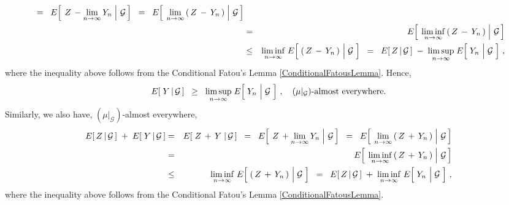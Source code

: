 \begin{enumerate}
\begin{eqnarray*}
	\;\; = \;\;
		E\!\left[\;\left.Z\,- \underset{n\rightarrow\infty}{\lim}\,Y_{n}\;\right\vert\,\mathcal{G}\,\right]
	\;\; = \;\;
		E\!\left[\;\left.\underset{n\rightarrow\infty}{\lim}\left(\,Z\,-\,Y_{n}\,\right)\;\right\vert\,\mathcal{G}\,\right]
	\\
	&=&
		E\!\left[\;\left.\underset{n\rightarrow\infty}{\liminf}\left(\,Z\,-\,Y_{n}\,\right)\;\right\vert\,\mathcal{G}\,\right]
	\\
	&\leq&
		\underset{n\rightarrow\infty}{\liminf}\;E\!\left[\;
			\left(\,Z\,-\,Y_{n}\,\right)\,\left\vert\;\overset{{\color{white}.}}{\mathcal{G}}\right.
			\,\right]
	\;\;=\;\;
		E\!\left[\,Z\,\vert\,\mathcal{G}\,\right] \;-\; 
		\underset{n\rightarrow\infty}{\limsup}\;E\!\left[\;
			Y_{n}\,\left\vert\;\overset{{\color{white}.}}{\mathcal{G}}\right.
			\,\right]\,,
	\end{eqnarray*}
	where the inequality above follows from the Conditional Fatou's Lemma \eqref{ConditionalFatousLemma}.
	Hence,
	\begin{equation*}
	E\!\left[\;Y\,\vert\,\mathcal{G}\,\right]
	\;\; \geq \;\;
		\underset{n\rightarrow\infty}{\limsup}\;E\!\left[\;
			Y_{n}\,\left\vert\;\overset{{\color{white}.}}{\mathcal{G}}\right.
			\,\right]\,,
	\quad
	\textnormal{$(\mu\vert_{\mathcal{G}})$-almost everywhere}.
	\end{equation*}
	Similarly, we also have, $(\mu\vert_{\mathcal{G}})$-almost everywhere,
	\begin{eqnarray*}
	E\!\left[\,Z\,\vert\,\mathcal{G}\,\right] \;+\; E\!\left[\;Y\,\vert\,\mathcal{G}\,\right]
	&=&
		E\!\left[\;Z\,+\,Y\;\vert\,\mathcal{G}\,\right]
	\;\; = \;\;
		E\!\left[\;\left.Z\,+ \underset{n\rightarrow\infty}{\lim}\,Y_{n}\;\right\vert\,\mathcal{G}\,\right]
	\;\; = \;\;
		E\!\left[\;\left.\underset{n\rightarrow\infty}{\lim}\left(\,Z\,+\,Y_{n}\,\right)\;\right\vert\,\mathcal{G}\,\right]
	\\
	&=&
		E\!\left[\;\left.\underset{n\rightarrow\infty}{\liminf}\left(\,Z\,+\,Y_{n}\,\right)\;\right\vert\,\mathcal{G}\,\right]
	\\
	&\leq&
		\underset{n\rightarrow\infty}{\liminf}\;E\!\left[\;
			\left(\,Z\,+\,Y_{n}\,\right)\,\left\vert\;\overset{{\color{white}.}}{\mathcal{G}}\right.
			\,\right]
	\;\;=\;\;
		E\!\left[\,Z\,\vert\,\mathcal{G}\,\right] \;+\; 
		\underset{n\rightarrow\infty}{\liminf}\;E\!\left[\;
			Y_{n}\,\left\vert\;\overset{{\color{white}.}}{\mathcal{G}}\right.
			\,\right]\,,
	\end{eqnarray*}
	where the inequality above follows from the Conditional Fatou's Lemma \eqref{ConditionalFatousLemma}.

\end{enumerate}

